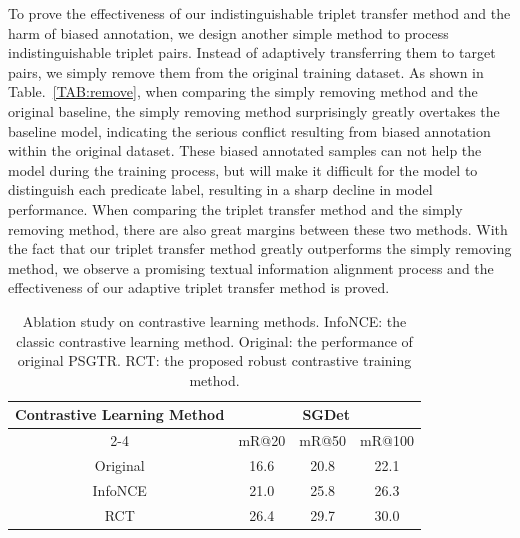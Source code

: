 \documentclass[letterpaper]{article} %
\begin{document}
 To prove the effectiveness of our indistinguishable triplet transfer method and the harm of biased annotation, we design another simple method to process indistinguishable triplet pairs. Instead of adaptively transferring them to target pairs, we simply remove them from the original training dataset.
As shown in Table.~\ref{TAB:remove}, when comparing the simply removing method and the original baseline, the simply removing method surprisingly greatly overtakes the baseline model, indicating the serious conflict resulting from biased annotation within the original dataset. These biased annotated samples can not help the model during the training process, but will make it difficult for the model to distinguish each predicate label, resulting in a sharp decline in model performance. When comparing the triplet transfer method and the simply removing method, there are also great margins between these two methods. With the fact that our triplet transfer method greatly outperforms the simply removing method, we observe a promising textual information alignment process and the effectiveness of our adaptive triplet transfer method is proved.





\begin{table}[]

\tabcolsep=0.05cm
\begin{tabular}{c|ccc}
\hline
\multirow{2}{*}{Contrastive Learning Method} & \multicolumn{3}{c}{SGDet} \\ \cline{2-4}
                                         & mR@20  & mR@50  & mR@100  \\ \hline
Original                                 & 16.6   & 20.8   & 22.1    \\ \hline
InfoNCE                                & 21.0   & 25.8   & 26.3    \\ \hline


RCT                                  & 26.4   & 29.7   & 30.0    \\ \hline
\end{tabular}
\caption{Ablation study on contrastive learning methods. InfoNCE: the classic contrastive learning method. Original: the performance of original PSGTR. RCT: the proposed robust contrastive training method.}
\label{nce}
\end{table}
\end{document}
